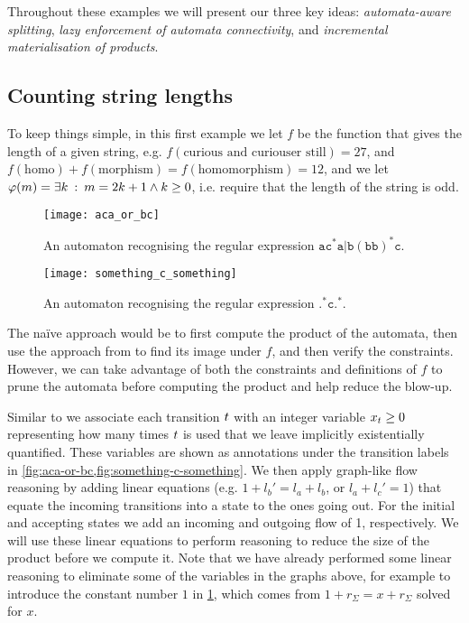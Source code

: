 \documentclass[acmsmall,review,anonymous,screen]{acmart}\settopmatter{printfolios=true,printccs=false,printacmref=true}
\theoremstyle{definition}
\begin{document}
 Throughout these examples we will present our three key ideas:
 \emph{automata-aware splitting}, \emph{lazy enforcement of automata
 connectivity}, and \emph{incremental materialisation of products}.
 
\subsection{Counting string lengths}

To keep things simple, in this first example we let $f$ be the function that
gives the length of a given string, e.g. $f\left(\text{curious and curiouser
still}\right) = 27$, and $f\left(\text{homo}\right) +
f\left(\text{morphism}\right) = f\left(\text{homomorphism}\right) = 12$, and we
let $\varphi(m) = \exists k \::\: m = 2k + 1 \land k \geq 0$,
i.e. require that the length of the string is odd.

\begin{figure}[t]
  \begin{minipage}[b]{0.50\linewidth}
  \centering 
    \texttt{[image: aca\_or\_bc]}
    \caption{An automaton recognising the regular expression
    $\mathtt{ac^*a|b(bb)^*c}$.}\label{fig:aca-or-bc}

    \texttt{[image: something\_c\_something]}
    \caption{An automaton recognising the regular expression
    $\mathtt{.^*c.^*}$.}\label{fig:something-c-something}
  \end{minipage}
  \end{figure}

The na\"ive approach would be to first compute the product of the automata, then
use the approach from \cite{generate-parikh-image} to find its image under $f$,
and then verify the constraints. However, we can take advantage of both the
constraints and definitions of $f$ to prune the automata before computing the
product and help reduce the blow-up.

Similar to \cite{generate-parikh-image} we associate each transition
$t$ with an integer variable $x_t \geq 0$
representing how many times $t$ is used that we leave implicitly
existentially quantified. These variables are shown as annotations under the
transition labels in \cref{fig:aca-or-bc,fig:something-c-something}. We then
apply graph-like flow reasoning by adding linear equations (e.g. $1 + {l_b}' =
l_a + l_b$, or $l_a + l_c' = 1$) that equate the incoming transitions into a
state to the ones going out. For the initial and accepting states we add an
incoming and outgoing flow of 1, respectively. We will use these linear
equations to perform reasoning to reduce the size of the product before we
compute it. Note that we have already performed some linear reasoning to
eliminate some of the variables in the graphs above, for example to introduce
the constant number $1$ in \cref{fig:something-c-something}, which comes from $1
+ r_\Sigma = x + r_\Sigma$ solved for $x$.
\end{document}
